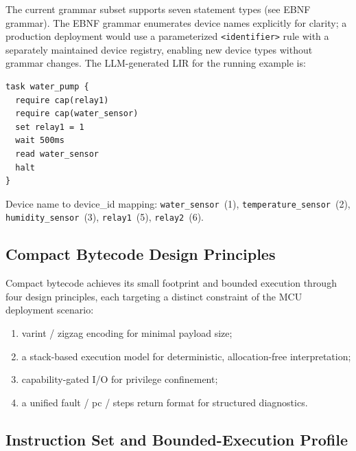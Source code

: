 \documentclass[a4paper,fleqn,longmktitle]{cas-dc}
\begin{document}
The current grammar subset supports seven statement types (see EBNF grammar). The EBNF grammar enumerates device names explicitly for clarity; a production deployment would use a parameterized \texttt{<identifier>} rule with a separately maintained device registry, enabling new device types without grammar changes. The LLM-generated LIR for the running example is:

\begin{lstlisting}[style=mirstyle,caption={Running example: LLM-generated LIR},label={lst:example}]
task water_pump {
  require cap(relay1)
  require cap(water_sensor)
  set relay1 = 1
  wait 500ms
  read water_sensor
  halt
}
\end{lstlisting}

Device name to device\_id mapping: \texttt{water\_sensor}~(1), \texttt{temperature\_sensor}~(2), \texttt{humidity\_sensor}~(3), \texttt{relay1}~(5), \texttt{relay2}~(6).

\subsection{Compact Bytecode Design Principles}
\label{sec:mbc_principles}

Compact bytecode achieves its small footprint and bounded execution through four design principles, each targeting a distinct constraint of the MCU deployment scenario:

\begin{enumerate}
  \item varint / zigzag encoding for minimal payload size;
  \item a stack-based execution model for deterministic, allocation-free interpretation;
  \item capability-gated I/O for privilege confinement;
  \item a unified fault / pc / steps return format for structured diagnostics.
\end{enumerate}

\subsection{Instruction Set and Bounded-Execution Profile}
\label{sec:instructions}
\end{document}
